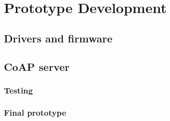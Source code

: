 \section{Prototype Development}

\subsection{Drivers and firmware}

\subsection{CoAP server}

\subsubsection{Testing}

\subsubsection{Final prototype}

